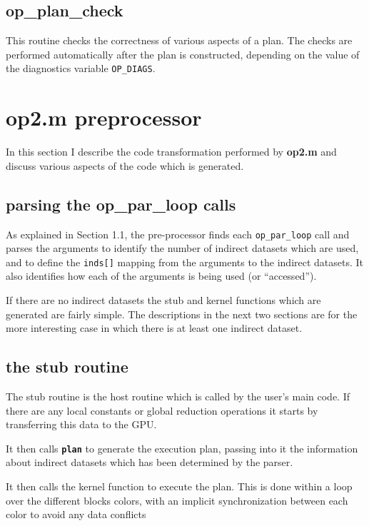 \documentclass[12pt]{article}
\begin{document}
\subsection{op\_plan\_check}

This routine checks the correctness of various aspects of a plan.  The checks 
are performed automatically after the plan is constructed, depending on the
value of the diagnostics variable {\tt OP\_DIAGS}.


\newpage

\section{op2.m preprocessor}

In this section I describe the code transformation performed by
{\bf op2.m} and discuss various aspects of the code which is generated.

\subsection{parsing the op\_par\_loop calls}

As explained in Section 1.1, the pre-processor finds each 
{\tt op\_par\_loop} call 
and parses the arguments to identify the number of indirect 
datasets which are used, and to define the {\tt inds[]} mapping from 
the arguments to the indirect datasets.  It also identifies how
each of the arguments is being used (or ``accessed'').

If there are no indirect datasets the stub and kernel functions
which are generated are fairly simple.  The descriptions in the next 
two sections are for the more interesting case in which there is
at least one indirect dataset.

\subsection{the stub routine}

The stub routine is the host routine which is called by the user's 
main code.  If there are any local constants or global reduction 
operations it starts by transferring this data to the GPU.

It then calls {\tt \bf plan} to generate the execution plan, 
passing into it the information about indirect datasets which 
has been determined by the parser.

It then calls the kernel function to execute the plan.  This is 
done within a loop over the different blocks colors, with an
implicit synchronization between each color to avoid any data 
conflicts
\end{document}
